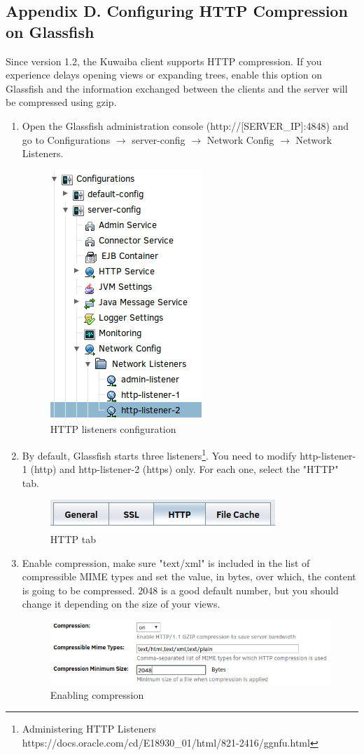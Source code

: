 \documentclass[a4paper]{article}
\begin{document}
\begin{appendices}
			\section{Appendix D. Configuring HTTP Compression on Glassfish} \label{app:AppendixD}
				Since version 1.2, the Kuwaiba client supports HTTP compression. If you experience delays opening views or expanding trees, enable this option on Glassfish and the information exchanged between the clients and the server will be compressed using gzip.
				\begin{enumerate}
					\item Open the Glassfish administration console (http://[SERVER\_IP]:4848) and go to Configurations $\rightarrow$ server-config $\rightarrow$ Network Config $\rightarrow$ Network Listeners.\\
					\begin{figure}[h!]
						\centering
						\includegraphics[width=0.2\linewidth]{img/gf_configurations_server_config.png} 	
						\caption{HTTP listeners configuration}
						\label{fig:listeners-config}
					\end{figure}
					\item By default, Glassfish starts three listeners\footnote{Administering HTTP Listeners https://docs.oracle.com/cd/E18930\_01/html/821-2416/ggnfu.html}. You need to modify http-listener-1 (http) and http-listener-2 (https) only. For each one, select the "HTTP" tab.
					\begin{figure}[h!]
						\centering
						\includegraphics[width=0.4\linewidth]{img/gf_edit_http_listener.png} 	
						\caption{HTTP tab}
						\label{fig:http-tab}
					\end{figure}
					\item Enable compression, make sure "text/xml" is included in the list of compressible MIME types and set the value, in bytes, over which, the content is going to be compressed. 2048 is a good default number, but you should change it depending on the size of your views.
					\begin{figure}[h!]
						\centering
						\includegraphics[width=0.7\linewidth]{img/gf_enable_compression.png} 	
						\caption{Enabling compression}
						\label{fig:enabling-compression}
					\end{figure}
				\end{enumerate}
			\newpage

\end{appendices}
\end{document}
